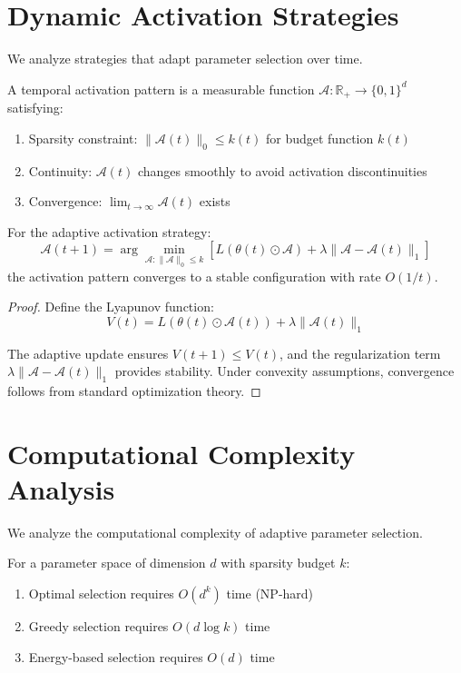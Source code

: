 \section{Dynamic Activation Strategies}

We analyze strategies that adapt parameter selection over time.

\begin{definition}
\label{def:temporal_activation}
A temporal activation pattern is a measurable function $\mathcal{A}: \mathbb{R}_+ \to \{0,1\}^d$ satisfying:
\begin{enumerate}
\item Sparsity constraint: $\|\mathcal{A}(t)\|_0 \leq k(t)$ for budget function $k(t)$
\item Continuity: $\mathcal{A}(t)$ changes smoothly to avoid activation discontinuities
\item Convergence: $\lim_{t \to \infty} \mathcal{A}(t)$ exists
\end{enumerate}
\end{definition}

\begin{theorem}
\label{thm:adaptive_convergence}
For the adaptive activation strategy:
$$\mathcal{A}(t+1) = \arg\min_{\mathcal{A}: \|\mathcal{A}\|_0 \leq k} \left[L(\theta(t) \odot \mathcal{A}) + \lambda \|\mathcal{A} - \mathcal{A}(t)\|_1\right]$$
the activation pattern converges to a stable configuration with rate $O(1/t)$.
\end{theorem}

\begin{proof}
Define the Lyapunov function:
$$V(t) = L(\theta(t) \odot \mathcal{A}(t)) + \lambda \|\mathcal{A}(t)\|_1$$

The adaptive update ensures $V(t+1) \leq V(t)$, and the regularization term $\lambda \|\mathcal{A} - \mathcal{A}(t)\|_1$ provides stability. Under convexity assumptions, convergence follows from standard optimization theory.
\end{proof}

\section{Computational Complexity Analysis}

We analyze the computational complexity of adaptive parameter selection.

\begin{theorem}
\label{thm:selection_complexity}
For a parameter space of dimension $d$ with sparsity budget $k$:
\begin{enumerate}
\item Optimal selection requires $O(d^k)$ time (NP-hard)
\item Greedy selection requires $O(d \log k)$ time
\item Energy-based selection requires $O(d)$ time
\end{enumerate}
\end{theorem}

